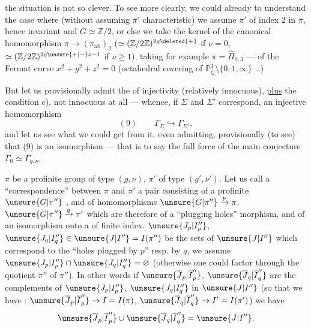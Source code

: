 the situation is  not so clever.
To see more clearly, we could already
 to understand the case where (without
assuming $\pi'$ characteristic) we assume $\pi'$ of index
2 in $\pi$, hence invariant and $G\simeq\mathbb Z/2$, or
else we take  the kernel of the canonical homomorphism
$\pi\longrightarrow(\pi_{\mathrm{ab}})_2$ ($\simeq(\mathbb Z/2\mathbb Z)^{2g\deleted{+}}$ if $\nu=0$,
$\simeq(\mathbb Z/2\mathbb Z)^{2g\unsure{+|-}\nu-1}$ if $\nu\geq1$), taking for example
$\pi=\widehat\Pi_{0,3}$ ---  of the
Fermat curve $x^2+y^2+z^2=0$ (octahedral covering
of $\mathbb P^1_{\overline{\mathbb Q}}\setminus\{0,1,\infty\}$ \dots)

But let us provisionally admit the 
of injectivity (relatively innocuous), \uline{plus} the
condition c), not innocuous at all ---
whence, if $\Sigma$ and $\Sigma'$ correspond, an injective
homomorphism
\[
(9)\qquad \Gamma_{\Sigma}\hookrightarrow\Gamma_{\Sigma'},
\]
and let us see what we could get from it.
even admitting, provisionally (to
see) that (9) is an isomorphism --- 
that is to say the full force of the main
conjecture $\Gamma_0\simeq\Gamma_{g,\nu}$.


 $\pi$ be a profinite group  of type $(g,\nu)$, $\pi'$ of type $(g',\nu')$. Let us call a ``correspondence'' between $\pi$ and $\pi'$ a  pair consisting of a profinite $\unsure{G|\pi''}$  , and of homomorphisms  $\unsure{G|\pi''}\xrightarrow{p}\pi$, $\unsure{G|\pi''}\xrightarrow{q}\pi'$ which are therefore   of a ``plugging holes'' morphism, and of an  isomorphism onto a  of finite index.
 $\unsure{J_p|I''_p}$, $\unsure{J_q|I''_q}\in\unsure{J|I''}=I(\pi'')$ be the sets of $\unsure{J|I''}$ which correspond to the ``holes plugged by $p$'' resp. by $q$, we assume  $\unsure{J_p|I''_p}\cap\unsure{J_q|I''_q}=\varnothing$ (otherwise one could factor through the  quotient $\widetilde{\pi}''$ of $\pi''$). In other words if $\unsure{\overline{J}_p|\overline{I}''_p}$, $\unsure{\overline{J}_q|\overline{I}''_q}$ are the complements of $\unsure{J_p|I''_p}$, $\unsure{J_q|I''_q}$ in $\unsure{J|I''}$ (so that we have : $\unsure{\overline{J}_p|\overline{I}''_p}\to I=I(\pi)$, $\unsure{\overline{J}_q|\overline{I}''_q}\to I'=I(\pi')$) we have
\[
\unsure{\overline{J}_p|\overline{I}''_p}\cup\unsure{\overline{J}_q|\overline{I}''_q}=\unsure{J|I''}.
\]

